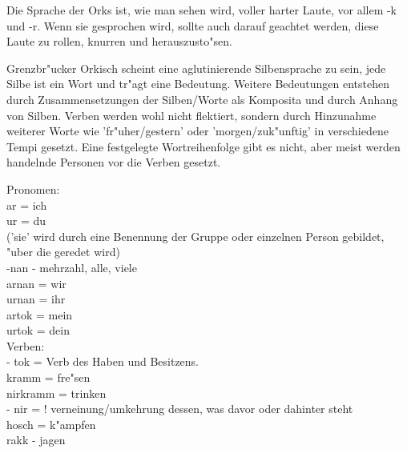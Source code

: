 \documentclass[a5paper,8pt]{book}
\begin{document}
Die Sprache der Orks ist, wie man sehen wird, voller harter Laute, vor allem -k und -r. Wenn sie gesprochen wird, sollte auch darauf geachtet werden, diese Laute zu rollen, knurren und herauszusto"sen. 

Grenzbr"ucker Orkisch scheint eine aglutinierende Silbensprache zu sein, jede Silbe ist ein Wort und  tr"agt  eine Bedeutung. Weitere Bedeutungen entstehen durch Zusammensetzungen der Silben/Worte als Komposita und durch Anhang von Silben. Verben werden wohl nicht flektiert, sondern durch Hinzunahme weiterer Worte wie 'fr"uher/gestern' oder 'morgen/zuk"unftig' in verschiedene Tempi gesetzt. Eine festgelegte Wortreihenfolge gibt es nicht, aber meist werden handelnde Personen vor die Verben gesetzt. 

\newpage

Pronomen:\\

ar =  ich \\
ur = du \\

('sie' wird durch eine Benennung der Gruppe oder einzelnen Person gebildet, "uber die geredet wird)\\

-nan - mehrzahl, alle, viele \\
arnan = wir \\
urnan = ihr \\

artok = mein \\
urtok = dein \\
\newpage
Verben:\\

- tok = Verb des Haben und Besitzens.\\

kramm = fre"sen \\
nirkramm = trinken \\

- nir =  ! verneinung/umkehrung dessen, was davor oder dahinter steht\\

hosch = k"ampfen \\
rakk - jagen \\

\newpage
\end{document}
